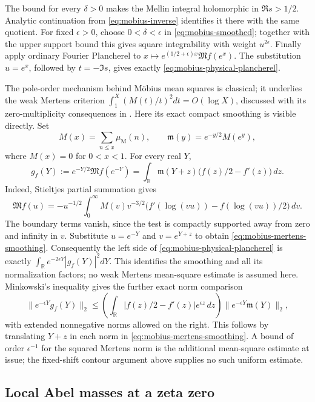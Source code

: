 The bound for every \(\delta>0\) makes the Mellin integral
holomorphic in \(\Re s>1/2\). Analytic continuation from
\eqref{eq:mobius-inverse} identifies it there with the same
quotient. For fixed \(\epsilon>0\), choose
\(0<\delta<\epsilon\) in \eqref{eq:mobius-smoothed}; together
with the upper support bound this gives square integrability
with weight \(u^{2\epsilon}\). Finally apply ordinary Fourier
Plancherel to
\(x\mapsto e^{(1/2+\epsilon)x}\mathfrak M f(e^x)\).
The substitution \(u=e^x\), followed by \(t=-\Im s\), gives
exactly \eqref{eq:mobius-physical-plancherel}.

The pole-order mechanism behind M\"obius mean squares is classical;
it underlies the weak Mertens criterion
\(\int_1^X(M(t)/t)^2dt=O(\log X)\), discussed with its
zero-multiplicity consequences in
\cite[preprint \S1, equations~(1.14)--(1.15), p.~3]{goldston-suriajaya2020}.
Here its exact compact smoothing is visible directly. Set
\[
 M(x)=\sum_{n\le x}\mu_{\mathrm M}(n),\qquad
 \mathfrak m(y)=e^{-y/2}M(e^y),
\]
where \(M(x)=0\) for \(0<x<1\). For every real \(Y\),
\begin{equation}\label{eq:mobius-mertens-smoothing}
 g_f(Y):=e^{-Y/2}\mathfrak M f(e^{-Y})
 =\int_{\mathbb R}\mathfrak m(Y+z)
                  \bigl(f(z)/2-f'(z)\bigr)\,dz.
\end{equation}
Indeed, Stieltjes partial summation gives
\[
 \mathfrak M f(u)
 =-u^{-1/2}\int_0^\infty M(v)v^{-3/2}
          \bigl(f'(\log(vu))-f(\log(vu))/2\bigr)\,dv.
\]
The boundary terms vanish, since the test is compactly supported
away from zero and infinity in \(v\). Substitute \(u=e^{-Y}\)
and \(v=e^{Y+z}\) to obtain
\eqref{eq:mobius-mertens-smoothing}. Consequently the left side of
\eqref{eq:mobius-physical-plancherel} is exactly
\(\int_{\mathbb R}e^{-2\epsilon Y}|g_f(Y)|^2dY\).
This identifies the smoothing and all its normalization factors;
no weak Mertens mean-square estimate is assumed here.
Minkowski's inequality gives the further exact norm comparison
\[
 \|e^{-\epsilon Y}g_f(Y)\|_2
 \le\left(\int_{\mathbb R}|f(z)/2-f'(z)|e^{\epsilon z}\,dz\right)
       \|e^{-\epsilon Y}\mathfrak m(Y)\|_2,
\]
with extended nonnegative norms allowed on the right. This follows
by translating \(Y+z\) in each norm in
\eqref{eq:mobius-mertens-smoothing}. A bound of order
\(\epsilon^{-1}\) for the squared Mertens norm is the additional
mean-square estimate at issue; the fixed-shift contour argument
above supplies no such uniform estimate.

\subsection{Local Abel masses at a zeta zero}

